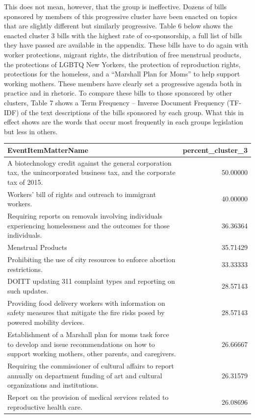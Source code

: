 \documentclass[
  letterpaper,
  DIV=11,
  numbers=noendperiod]{scrartcl}
\begin{document}
This does not mean, however, that the group is ineffective. Dozens of
bills sponsored by members of this progressive cluster have been enacted
on topics that are slightly different but similarly progressive. Table 6
below shows the enacted cluster 3 bills with the highest rate of
co-sponsorship, a full list of bills they have passed are available in
the appendix. These bills have to do again with worker protections,
migrant rights, the distribution of free menstrual products, the
protections of LGBTQ New Yorkers, the protection of reproduction rights,
protections for the homeless, and a ``Marshall Plan for Moms'' to help
support working mothers. These members have clearly set a progressive
agenda both in practice and in rhetoric. To compare these bills to those
sponsored by other clusters, Table 7 shows a Term Frequency -- Inverse
Document Frequency (TF-IDF) of the text descriptions of the bills
sponsored by each group. What this in effect shows are the words that
occur most frequently in each groups legislation but less in others.

\begin{longtable}{lr}
\toprule
EventItemMatterName & percent\_cluster\_3 \\ 
\midrule
A biotechnology credit against the general corporation tax, the unincorporated business tax, and the corporate tax of 2015. & 50.00000 \\ 
Workers’ bill of rights and outreach to immigrant workers. & 40.00000 \\ 
Requiring reports on removals involving individuals experiencing homelessness and the outcomes for those individuals. & 36.36364 \\ 
Menstrual Products & 35.71429 \\ 
Prohibiting the use of city resources to enforce abortion restrictions. & 33.33333 \\ 
DOITT updating 311 complaint types and reporting on such updates. & 28.57143 \\ 
Providing food delivery workers with information on safety measures that mitigate the fire risks posed by powered mobility devices. & 28.57143 \\ 
Establishment of a Marshall plan for moms task force to develop and issue recommendations on how to support working mothers, other parents, and caregivers. & 26.66667 \\ 
Requiring the commissioner of cultural affairs to report annually on department funding of art and cultural organizations and institutions. & 26.31579 \\ 
Report on the provision of medical services related to reproductive health care. & 26.08696 \\ 
\bottomrule
\end{longtable}
\end{document}
